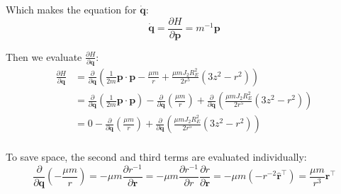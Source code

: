\documentclass[titlepage]{article}
\begin{document}
Which makes the equation for $\dot{\boldsymbol{q}}$:
\begin{equation}
	\dot{\boldsymbol{q}}=\frac{\partial H}{\partial\boldsymbol{p}}=m^{-1}\boldsymbol{p}
\end{equation}

Then we evaluate $\frac{\partial H}{\partial\boldsymbol{q}}$:
\begin{equation}
	\begin{split}
		\frac{\partial H}{\partial\boldsymbol{q}}&=\frac{\partial}{\partial\boldsymbol{q}}\left(\frac{1}{2m}\boldsymbol{p}\cdot\boldsymbol{p}-\frac{\mu m}{r}+\frac{\mu mJ_2R_E^2}{2r^5}\left(3z^2-r^2\right)\right) \\
		&=\frac{\partial}{\partial\boldsymbol{q}}\left(\frac{1}{2m}\boldsymbol{p}\cdot\boldsymbol{p}\right)-\frac{\partial}{\partial\boldsymbol{q}}\left(\frac{\mu m}{r}\right)+\frac{\partial}{\partial\boldsymbol{q}}\left(\frac{\mu mJ_2R_E^2}{2r^5}\left(3z^2-r^2\right)\right) \\
		&=0-\frac{\partial}{\partial\boldsymbol{q}}\left(\frac{\mu m}{r}\right)+\frac{\partial}{\partial\boldsymbol{q}}\left(\frac{\mu mJ_2R_E^2}{2r^5}\left(3z^2-r^2\right)\right) \\
	\end{split}
	\label{eq:parteval}
\end{equation}

To save space, the second and third terms are evaluated individually:
\begin{equation}
	\frac{\partial}{\partial\boldsymbol{q}}\left(-\frac{\mu m}{r}\right)=-\mu m\frac{\partial r^{-1}}{\partial\boldsymbol{r}}=-\mu m\frac{\partial r^{-1}}{\partial r}\frac{\partial r}{\partial\boldsymbol{r}}=-\mu m\left(-r^{-2}\hat{\boldsymbol{r}}^\top\right)=\frac{\mu m}{r^3}\boldsymbol{r}^\top
\end{equation}
\end{document}
